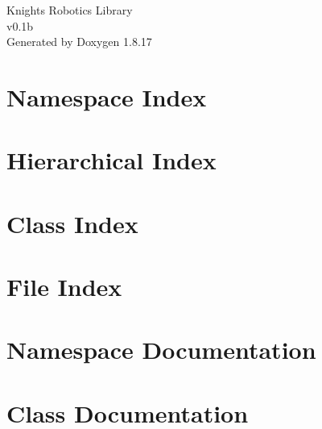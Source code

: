 \let\mypdfximage\pdfximage\def\pdfximage{\immediate\mypdfximage}\documentclass[twoside]{book}
\newcommand{\+}{\discretionary{\mbox{\scriptsize$\hookleftarrow$}}{}{}}
\newcommand{\clearemptydoublepage}{%
  \newpage{\pagestyle{empty}\cleardoublepage}%
}
\begin{document}
\hypersetup{pageanchor=false,
             bookmarksnumbered=true,
             pdfencoding=unicode
            }
\begin{titlepage}
\vspace*{7cm}
\begin{center}%
{\Large Knights Robotics Library \\[1ex]\large v0.\+1b }\\
\vspace*{1cm}
{\large Generated by Doxygen 1.8.17}\\
\end{center}
\end{titlepage}
\clearemptydoublepage
{}
\tableofcontents
\clearemptydoublepage
{}
\hypersetup{pageanchor=true}

\chapter{Namespace Index}

\chapter{Hierarchical Index}

\chapter{Class Index}

\chapter{File Index}

\chapter{Namespace Documentation}




\chapter{Class Documentation}



























\end{document}
